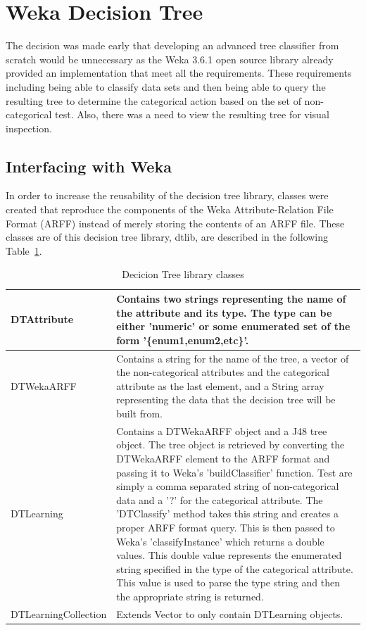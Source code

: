 \section{Weka Decision Tree}
The decision was made early that developing an advanced tree classifier from scratch would
be unnecessary as the Weka 3.6.1\cite{weka} open source library already provided an implementation that meet
all the requirements.  These requirements including being able to classify data sets and 
then being able to query the resulting tree to determine the categorical action based on the set
of non-categorical test.  Also, there was a need to view the resulting tree for visual inspection.

\subsection{Interfacing with Weka}
In order to increase the reusability of the decision tree library, classes were created that 
reproduce the components of the Weka Attribute-Relation File Format (ARFF) instead of merely
storing the contents of an ARFF file.  These classes are of this decision tree library, dtlib, 
are described in the following Table~\ref{table:attribs}.

\begin{table}[h]
\centering
\begin{tabular}{|l|p{5in}|}
\hline
DTAttribute &
Contains two strings representing the name of the attribute and its type.
The type can be either 'numeric' or some enumerated set of the form '\{enum1,enum2,etc\}'.\\
\hline
DTWekaARFF &
Contains a string for the name of the tree, a vector of the non-categorical attributes and the 
categorical attribute as the last element, and a String array representing the data that the 
decision tree will be built from.\\
\hline
DTLearning &
Contains a DTWekaARFF object and a J48 tree object.  The tree object is retrieved by converting
the DTWekaARFF element to the ARFF format and passing it to Weka's 'buildClassifier' function.  
Test are simply a comma separated string of non-categorical data and a '?' for the categorical 
attribute.  The 'DTClassify' method takes this string and creates a proper ARFF format query.
This is then passed to Weka's 'classifyInstance' which returns a double values.  This double value
represents the enumerated string specified in the type of the categorical attribute.  This value is
used to parse the type string and then the appropriate string is returned.  \\
\hline
DTLearningCollection &
Extends Vector to only contain DTLearning objects.\\
\hline
\end{tabular}
\caption{Decicion Tree library classes}
\label{table:attribs}
\end{table}

